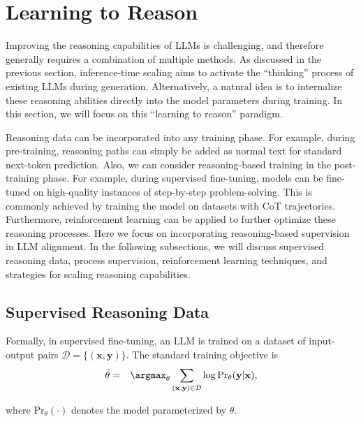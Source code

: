 
\section{Learning to Reason}

Improving the reasoning capabilities of LLMs is challenging, and therefore generally requires a combination of multiple methods. As discussed in the previous section, inference-time scaling aims to activate the ``thinking'' process of existing LLMs during generation. Alternatively, a natural idea is to internalize these reasoning abilities directly into the model parameters during training. In this section, we will focus on this ``learning to reason'' paradigm.

Reasoning data can be incorporated into any training phase. For example, during pre-training, reasoning paths can simply be added as normal text for standard next-token prediction. Also, we can consider reasoning-based training in the post-training phase. For example, during supervised fine-tuning, models can be fine-tuned on high-quality instances of step-by-step problem-solving. This is commonly achieved by training the model on datasets with CoT trajectories. Furthermore, reinforcement learning can be applied to further optimize these reasoning processes. Here we focus on incorporating reasoning-based supervision in LLM alignment. In the following subsections, we will discuss supervised reasoning data, process supervision, reinforcement learning techniques, and strategies for scaling reasoning capabilities.

\subsection{Supervised Reasoning Data}

Formally, in supervised fine-tuning, an LLM is trained on a dataset of input-output pairs $\mathcal{D} = \{(\mathbf{x}, \mathbf{y})\}$. The standard training objective is
\begin{eqnarray}
\hat{\theta} & = & \argmax_{\theta} \sum_{(\mathbf{x}, \mathbf{y}) \in \mathcal{D}} \log \mathrm{Pr}_{\theta} (\mathbf{y}|\mathbf{x}),
\end{eqnarray}

\noindent where $\mathrm{Pr}_{\theta}(\cdot)$ denotes the model parameterized by $\theta$.

